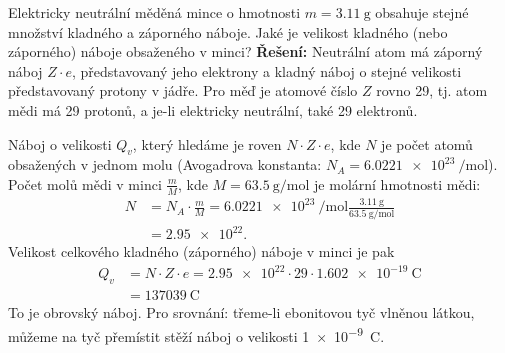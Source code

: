 \begin{mdframed}[style=mdexam]
\begin{example}
  Elektricky neutrální měděná mince o hmotnosti \(m = \SI{3.11}{\g}\) obsahuje stejné množství
  kladného a záporného náboje. Jaké je velikost kladného (nebo záporného) náboje obsaženého v
  minci?\newline  
  \textbf{Řešení:}\newline
  Neutrální atom má záporný náboj \(Z\cdot e\), představovaný jeho elektrony a kladný náboj o stejné
  velikosti představovaný protony v jádře. Pro měď je atomové číslo \(Z\) rovno \num{29}, tj. atom
  mědi má \num{29} protonů, a je-li elektricky neutrální, také \num{29} elektronů.
  
  Náboj o velikosti \(Q_v\), který hledáme je roven \(N\cdot Z\cdot e\), kde \(N\) je počet atomů
  obsažených v  jednom molu (Avogadrova konstanta: \(N_A = \SI{6.0221e23}{\per\mole}\)). Počet molů
  mědi v minci \(\frac{m}{M}\), kde \(M = \SI{63.5}{\g\per\mole}\) je molární hmotnosti mědi:    
  \begin{align*}
    N &=N_A\cdot\frac{m}{M}=\SI{6.0221e23}{\per\mole}\frac{\SI{3.11}{\g}}{\SI{63.5}{\g\per\mole}}\\ 
      &=\num{2.95e22}.
  \end{align*}
  Velikost celkového kladného (záporného) náboje v minci je pak 
  \begin{align*}
    Q_v &= N\cdot Z\cdot e = \num{2.95e22}\cdot\num{29}\cdot\SI{1.602e-19}{\coulomb}    \\
        &= \SI{137039}{\coulomb}
  \end{align*}
  To je obrovský náboj. Pro srovnání: třeme-li ebonitovou tyč vlněnou látkou, můžeme na tyč
  přemístit stěží náboj o velikosti \SI{1e-9}{\coulomb}.
\end{example} 
\end{mdframed}
